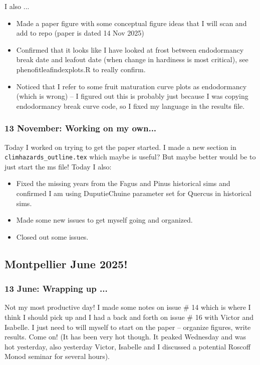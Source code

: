 \documentclass[11pt,letter]{article}
\begin{document}
I also ... 
\begin{itemize}
\item Made a paper figure with some conceptual figure ideas that I will scan and add to repo (paper is dated 14 Nov 2025)
\item Confirmed that it looks like I have looked at frost between endodormancy break date and leafout date (when change in hardiness is most critical), see phenofitleafindexplots.R to really confirm.
\item Noticed that I refer to some fruit maturation curve plots as endodormancy (which is wrong) -- I figured out this is probably just because I was copying endodormancy break curve code, so I fixed my language in the results file. 
\end{itemize}

\subsubsection{13 November: Working on my own...}

Today I worked on trying to get the paper started. I made a new section in \verb|climhazards_outline.tex| which maybe is useful? But maybe better would be to just start the ms file! Today I also:

\begin{itemize}
\item Fixed the missing years from the Fagus and Pinus historical sims and confirmed I am using DuputieChuine parameter set for Quercus in historical sims. 
\item Made some new issues to get myself going and organized.
\item Closed out some issues. 
\end{itemize}

\subsection{Montpellier June 2025!}

\subsubsection{13 June: Wrapping up ...}

Not my most productive day! I made some notes on issue \# 14 which is where I think I should pick up and I had a back and forth on issue \# 16 with Victor and Isabelle. I just need to will myself to start on the paper -- organize figures, write results. Come on! (It has been very hot though. It peaked Wednesday and was hot yesterday, also yesterday Victor, Isabelle and I discussed a potential Roscoff Monod seminar for several hours). 
\end{document}
